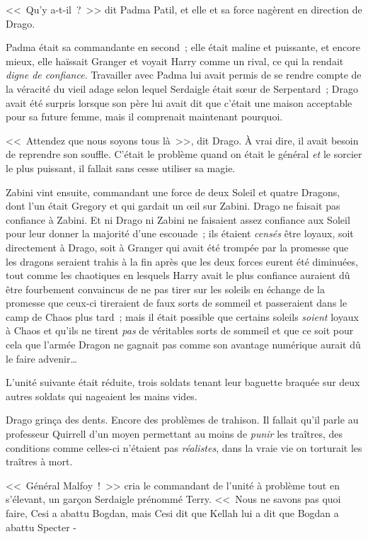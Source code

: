 <<~Qu'y a-t-il~?~>> dit Padma Patil, et elle et sa force nagèrent en direction de Drago.

Padma était sa commandante en second~; elle était maline et puissante, et encore mieux, elle haïssait Granger et voyait Harry comme un rival, ce qui la rendait \emph{digne de confiance}. Travailler avec Padma lui avait permis de se rendre compte de la véracité du vieil adage selon lequel Serdaigle était sœur de Serpentard~; Drago avait été surpris lorsque son père lui avait dit que c'était une maison acceptable pour sa future femme, mais il comprenait maintenant pourquoi.

<<~Attendez que nous soyons tous là~>>, dit Drago. À vrai dire, il avait besoin de reprendre son souffle. C'était le problème quand on était le général \emph{et} le sorcier le plus puissant, il fallait sans cesse utiliser sa magie.

Zabini vint ensuite, commandant une force de deux Soleil et quatre Dragons, dont l'un était Gregory et qui gardait un œil sur Zabini. Drago ne faisait pas confiance à Zabini. Et ni Drago ni Zabini ne faisaient assez confiance aux Soleil pour leur donner la majorité d'une escouade~; ils étaient \emph{censés} être loyaux, soit directement à Drago, soit à Granger qui avait été trompée par la promesse que les dragons seraient trahis à la fin après que les deux forces eurent été diminuées, tout comme les chaotiques en lesquels Harry avait le plus confiance auraient dû être fourbement convaincus de ne pas tirer sur les soleils en échange de la promesse que ceux-ci tireraient de faux sorts de sommeil et passeraient dans le camp de Chaos plus tard~; mais il était possible que certains soleils \emph{soient} loyaux à Chaos et qu'ils ne tirent \emph{pas} de véritables sorts de sommeil et que ce soit pour cela que l'armée Dragon ne gagnait pas comme son avantage numérique aurait dû le faire advenir…

L'unité suivante était réduite, trois soldats tenant leur baguette braquée sur deux autres soldats qui nageaient les mains vides.

Drago grinça des dents. Encore des problèmes de trahison. Il fallait qu'il parle au professeur Quirrell d'un moyen permettant au moins de \emph{punir} les traîtres, des conditions comme celles-ci n'étaient pas \emph{réalistes}, dans la vraie vie on torturait les traîtres à mort.

<<~Général Malfoy~!~>> cria le commandant de l'unité à problème tout en s'élevant, un garçon Serdaigle prénommé Terry. <<~Nous ne savons pas quoi faire, Cesi a abattu Bogdan, mais Cesi dit que Kellah lui a dit que Bogdan a abattu Specter -

